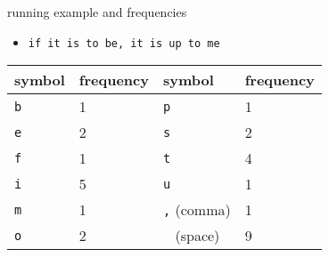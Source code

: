 \begin{frame}[fragile,label=runningExAndFreq]{running example and frequencies}
    \begin{itemize}
    \item \verb|if it is to be, it is up to me|
    \end{itemize}
\begin{tabular}{ll||ll}
    symbol & frequency & symbol & frequency \\ \hline
    \tt b & 1 & \tt p & 1 \\
    \tt e & 2 & \tt s & 2 \\
    \tt f & 1 & \tt t & 4 \\
    \tt i & 5 & \tt u & 1 \\
    \tt m & 1 & \texttt{,} (comma) & 1 \\
    \tt o & 2 & \verb*| | (space) & 9 \\
\end{tabular}
\end{frame}
